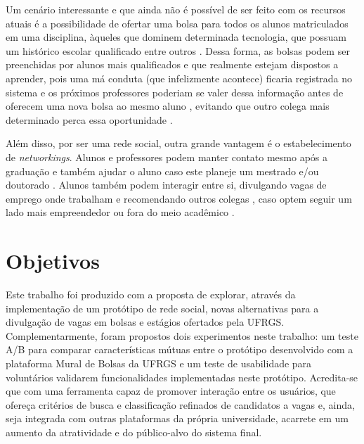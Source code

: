Um cenário interessante e que ainda não é possível de ser feito com os recursos atuais é a possibilidade de ofertar uma bolsa para todos os alunos matriculados em uma disciplina, àqueles que dominem determinada tecnologia, que possuam um histórico escolar qualificado entre outros \cite{designCurriculumArticle} \cite{minigLinkedinInbook}. Dessa forma, as bolsas podem ser preenchidas por alunos mais
qualificados e que realmente estejam dispostos a aprender, pois uma má conduta (que infelizmente acontece) ficaria registrada no sistema e os próximos professores poderiam se valer dessa informação antes de oferecem uma nova bolsa ao mesmo aluno \cite{academicAchievmentArticle}, evitando que
outro colega mais determinado perca essa oportunidade \cite{futureITLinkedinArticle}. 

Além disso, por ser uma rede social, outra grande vantagem é o estabelecimento de \textit{networkings}. Alunos e professores podem manter contato mesmo após a graduação e também ajudar o aluno caso este planeje um mestrado e/ou doutorado \cite{alumniInbook}. Alunos também podem interagir entre si, divulgando vagas de emprego onde trabalham e recomendando outros colegas \cite{recommendPeopleInbook}, caso optem seguir um lado mais empreendedor \cite{SNsEntrepreunersInbook} ou fora do meio acadêmico \cite{globalParticipationInbook}.


\section{Objetivos}
\label{introducaoObjetivos}
Este trabalho foi produzido com a proposta de explorar, através da implementação de um protótipo de rede social, novas alternativas para a divulgação de vagas em bolsas e estágios ofertados pela UFRGS. Complementarmente, foram propostos dois experimentos neste trabalho: um teste A/B \cite{abTestArticle} para comparar características mútuas entre o protótipo desenvolvido com a plataforma Mural de Bolsas da UFRGS e um teste de usabilidade para voluntários validarem funcionalidades implementadas neste protótipo. Acredita-se que com uma ferramenta capaz de promover interação entre os usuários, que ofereça critérios de busca e classificação refinados de candidatos a vagas e, ainda, seja integrada com outras plataformas da própria universidade, acarrete em um aumento da atratividade e do público-alvo do sistema final.


